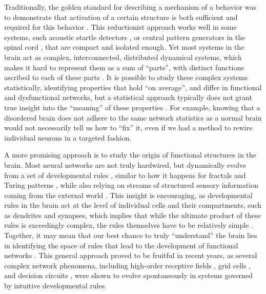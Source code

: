 \documentclass{article}
\begin{document}
Traditionally, the golden standard for describing a mechanism of a behavior was to demonstrate that activation of a certain structure is both sufficient and required for this behavior \citep{krakauer2017reductionist}. This reductionist approach works well in some systems, such acoustic startle detectors \citep{korn2005mauthner}, or central pattern generators in the spinal cord \citep{roberts2010hatchling}, that are compact and isolated enough. Yet most systems in the brain act as complex, interconnected, distributed dynamical systems, which makes it hard to represent them as a sum of “parts”, with distinct functions ascribed to each of these parts \citep{gao2015simplicity}. It is possible to study these complex systems statistically, identifying properties that hold “on average”, and differ in functional and dysfunctional networks, but a statistical approach typically does not grant true insight into the “meaning” of these properties \citep{bassett2018models}. For example, knowing that a disordered brain does not adhere to the same network statistics as a normal brain would not necessarily tell us how to “fix” it, even if we had a method to rewire individual neurons in a targeted fashion.

A more promising approach is to study the origin of functional structures in the brain. Most neural networks are not truly hardwired, but dynamically evolve from a set of developmental rules \citep{pietri2017emergence}, similar to how it happens for fractals and Turing patterns \citep{lefevre2010reaction,bullmore2012economy}, while also relying on streams of structured sensory information coming from the external world \citep{gao2015simplicity}. This insight is encouraging, as developmental rules in the brain act at the level of individual cells and their compartments, such as dendrites and synapses, which implies that while the ultimate product of these rules is exceedingly complex, the rules themselves have to be relatively simple \citep{bassett2018models}. Together, it may mean that our best chance to truly “understand” the brain lies in identifying the space of rules that lead to the development of functional networks \citep{linderman2017constrain}. This general approach proved to be fruitful in recent years, as several complex network phenomena, including high-order receptive fields \citep{bashivan2018neural}, grid cells \citep{banino2018grid}, and decision circuits \citep{haesemeyer2018convergent}, were shown to evolve spontaneously in systems governed by intuitive developmental rules. 
\end{document}

